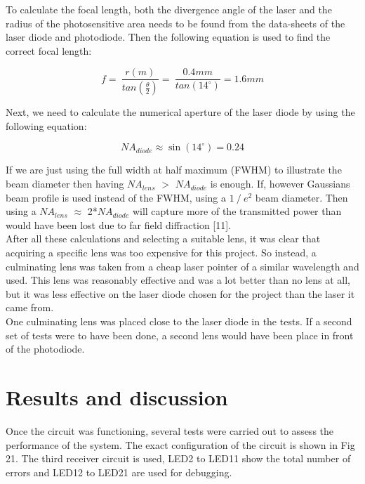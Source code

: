 \documentclass[conference]{IEEEtran}
\begin{document}
To calculate the focal length, both the divergence angle of the laser and the radius of the photosensitive area needs to be found from the data-sheets of the laser diode and photodiode. Then the following equation is used to find the correct focal length:

\begin{equation}
f=\ \frac{r(m)}{tan⁡(\frac{\theta{}}{2})}=\
\frac{0.4mm}{tan⁡(14^\circ{})}=1.6mm
\end{equation}

Next, we need to calculate the numerical aperture of the laser diode by using the following equation:

\begin{equation}
{NA}_{diode}\approx{}\sin{\left(14^\circ{}\right)}=0.24
\end{equation}

If we are just using the full width at half maximum (FWHM) to illustrate the beam diameter then having $NA_{lens}$ $>$ $NA_{diode}$ is enough. If, however Gaussians beam profile is used instead of the FWHM, using a $1⁄e^{2}$   beam diameter. Then using a $NA_{lens}$ 	$\approx$ 2*$NA_{diode}$ will capture more of the transmitted power than would have been lost due to far field diffraction [11]. \\

After all these calculations and selecting a suitable lens, it was clear that acquiring a specific lens was too expensive for this project. So instead, a culminating lens was taken from a cheap laser pointer of a similar wavelength and used. This lens was reasonably effective and was a lot better than no lens at all, but it was less effective on the laser diode chosen for the project than the laser it came from. \\

One culminating lens was placed close to the laser diode in the tests. If a second set of tests were to have been done, a second lens would have been place in front of the photodiode.

\section{Results and discussion}

Once the circuit was functioning, several tests were carried out to assess the performance of the system. The exact configuration of the circuit is shown in Fig 21. The third receiver circuit is used, LED2 to LED11 show the total number of errors and LED12 to LED21 are used for debugging.
\end{document}
